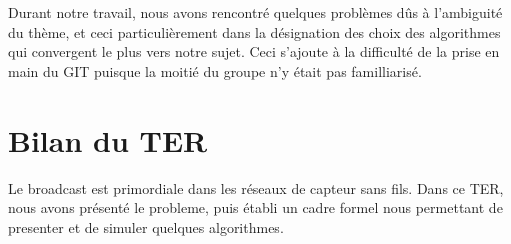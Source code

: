 Durant notre travail, nous avons rencontré quelques problèmes dûs à l'ambiguité du thème, et ceci particulièrement
dans la désignation des choix des algorithmes qui convergent le plus vers notre sujet. Ceci s'ajoute à la difficulté 
de la prise en main du GIT puisque la moitié du groupe n'y était pas familliarisé.

\section{Bilan du TER}

Le broadcast est primordiale dans les réseaux de capteur sans fils. Dans ce TER, nous avons présenté le probleme, puis établi un cadre 
formel nous permettant de presenter et de simuler quelques algorithmes. 
